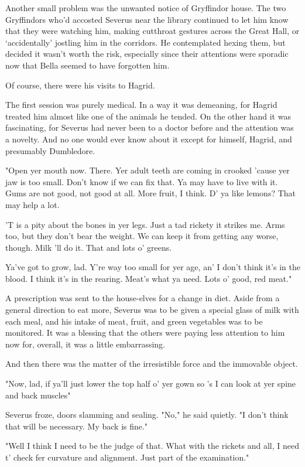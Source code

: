 Another small problem was the unwanted notice of Gryffindor house. The two Gryffindors who'd accosted Severus near the library continued to let him know that they were watching him, making cutthroat gestures across the Great Hall, or `accidentally' jostling him in the corridors. He contemplated hexing them, but decided it wasn't worth the risk, especially since their attentions were sporadic now that Bella seemed to have forgotten him.

Of course, there were his visits to Hagrid.

The first session was purely medical. In a way it was demeaning, for Hagrid treated him almost like one of the animals he tended. On the other hand it was fascinating, for Severus had never been to a doctor before and the attention was a novelty. And no one would ever know about it except for himself, Hagrid, and presumably Dumbledore.

"Open yer mouth now. There. Yer adult teeth are coming in crooked 'cause yer jaw is too small. Don't know if we can fix that. Ya may have to live with it. Gums are not good, not good at all. More fruit, I think. D' ya like lemons? That may help a lot.

\textooquote 'T is a pity about the bones in yer legs. Just a tad rickety it strikes me. Arms too, but they don't bear the weight. We can keep it from getting any worse, though. Milk 'll do it. That and lots o' greens.

\textooquote Ya've got to grow, lad. Y're way too small for yer age, an' I don't think it's in the blood. I think it's in the rearing. Meat's what ya need. Lots o' good, red meat."

A prescription was sent to the house-elves for a change in diet. Aside from a general direction to eat more, Severus was to be given a special glass of milk with each meal, and his intake of meat, fruit, and green vegetables was to be monitored. It was a blessing that the others were paying less attention to him now for, overall, it was a little{\el} embarrassing.

And then there was the matter of the irresistible force and the immovable object.

"Now, lad, if ya'll just lower the top half o' yer gown so 's I can look at yer spine and back muscles{\el}"

Severus froze, doors slamming and sealing. "No," he said quietly. "I don't think that will be necessary. My back is fine."

"Well I think I need to be the judge of that. What with the rickets and all, I need t' check fer curvature and alignment. Just part of the examination."

